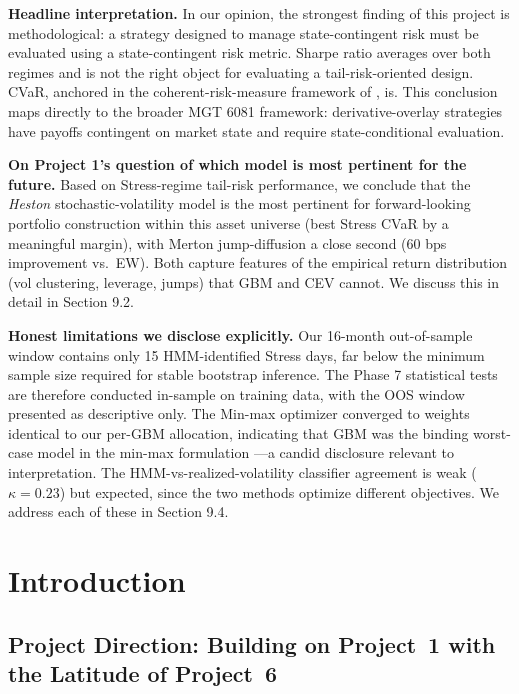 \documentclass[11pt,letterpaper]{article}
\begin{document}
\textbf{Headline interpretation.} In our opinion, the strongest finding of this project is methodological: a strategy designed to manage state-contingent risk must be evaluated using a state-contingent risk metric. Sharpe ratio averages over both regimes and is not the right object for evaluating a tail-risk-oriented design. CVaR, anchored in the coherent-risk-measure framework of \citet{artzner1999coherent}, is. This conclusion maps directly to the broader MGT 6081 framework: derivative-overlay strategies have payoffs contingent on market state and require state-conditional evaluation.

\textbf{On Project 1's question of which model is most pertinent for the future.} Based on Stress-regime tail-risk performance, we conclude that the \emph{Heston} stochastic-volatility model is the most pertinent for forward-looking portfolio construction within this asset universe (best Stress CVaR by a meaningful margin), with Merton jump-diffusion a close second (60 bps improvement vs.\ EW). Both capture features of the empirical return distribution (vol clustering, leverage, jumps) that GBM and CEV cannot. We discuss this in detail in Section 9.2.

\textbf{Honest limitations we disclose explicitly.} Our 16-month out-of-sample window contains only 15 HMM-identified Stress days, far below the minimum sample size required for stable bootstrap inference. The Phase 7 statistical tests are therefore conducted in-sample on training data, with the OOS window presented as descriptive only. The Min-max optimizer converged to weights identical to our per-GBM allocation, indicating that GBM was the binding worst-case model in the min-max formulation —a candid disclosure relevant to interpretation. The HMM-vs-realized-volatility classifier agreement is weak ($\kappa = 0.23$) but expected, since the two methods optimize different objectives. We address each of these in Section 9.4.

\newpage
\tableofcontents
\newpage

\section{Introduction}

\subsection{Project Direction: Building on Project~1 with the Latitude of Project~6}
\end{document}
